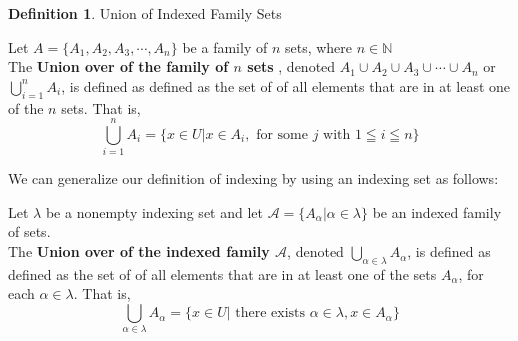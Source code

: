 \documentclass{book}
\theoremstyle{definition}
\newtheorem{definition}{Definition}[section]
\theoremstyle{remark}
\newcommand{\bb}[1]{\mathbb{#1}}
\begin{document}
\begin{definition}
Union of Indexed Family Sets \footnotemark \\
    \begin{tcolorbox}
    Let $A = \{A_1, A_2, A_3, \cdots, A_n  \}$ be a family of $n$ sets, where $n \in \bb{N}$ \\ 
    
    The \textbf{Union over of the family of $n$ sets} , denoted $A_1 \cup A_2 \cup A_3 \cup \cdots \cup A_n$ or $\bigcup_{i=1}^{n}{A_i}$, is defined as defined as the set of of all elements that are in at least one of the $n$ sets. That is,  
        \begin{equation*}
            \bigcup_{i=1}^{n}{A_i} = \{x \in U | x \in A_i, \text{ for some } j \text{ with } 1 \leqq i \leqq n \}
        \end{equation*}
\end{tcolorbox}
We can generalize our definition of indexing by using an indexing set as follows:

    \begin{tcolorbox}
    Let $\lambda$ be a nonempty indexing set and let $\mathcal{A} = \{ A_{\alpha} | \alpha \in \lambda \}$ be an indexed family of sets. \\ 
    The \textbf{Union over of the indexed family $\mathcal{A}$}, denoted $\bigcup_{\alpha \in \lambda}{A_{\alpha}}$, is defined as defined as the set of of all elements that are in at least one of the sets $A_{\alpha}$, for each $\alpha \in \lambda$. That is,  
        \begin{equation*}
            \bigcup_{\alpha \in \lambda}{A_{\alpha}} = \{x \in U | \text{ there exists } \alpha \in \lambda, x \in A_{\alpha} \}
        \end{equation*}
    \end{tcolorbox}
\end{definition}
\end{document}

